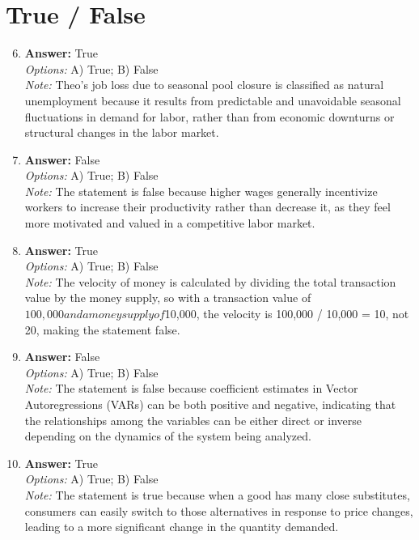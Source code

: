 \documentclass[12pt]{article}
\begin{document}
\section*{True / False}
\begin{enumerate}[label=\arabic*.]
\setcounter{enumi}{5}
\item \textbf{Answer:} True
\\ \textit{Options:} A) True; B) False
\\ \textit{Note:} Theo's job loss due to seasonal pool closure is classified as natural unemployment because it results from predictable and unavoidable seasonal fluctuations in demand for labor, rather than from economic downturns or structural changes in the labor market.
\item \textbf{Answer:} False
\\ \textit{Options:} A) True; B) False
\\ \textit{Note:} The statement is false because higher wages generally incentivize workers to increase their productivity rather than decrease it, as they feel more motivated and valued in a competitive labor market.
\item \textbf{Answer:} True
\\ \textit{Options:} A) True; B) False
\\ \textit{Note:} The velocity of money is calculated by dividing the total transaction value by the money supply, so with a transaction value of $100,000 and a money supply of $10,000, the velocity is 100,000 / 10,000 = 10, not 20, making the statement false.
\item \textbf{Answer:} False
\\ \textit{Options:} A) True; B) False
\\ \textit{Note:} The statement is false because coefficient estimates in Vector Autoregressions (VARs) can be both positive and negative, indicating that the relationships among the variables can be either direct or inverse depending on the dynamics of the system being analyzed.
\item \textbf{Answer:} True
\\ \textit{Options:} A) True; B) False
\\ \textit{Note:} The statement is true because when a good has many close substitutes, consumers can easily switch to those alternatives in response to price changes, leading to a more significant change in the quantity demanded.
\end{enumerate}
\end{document}
